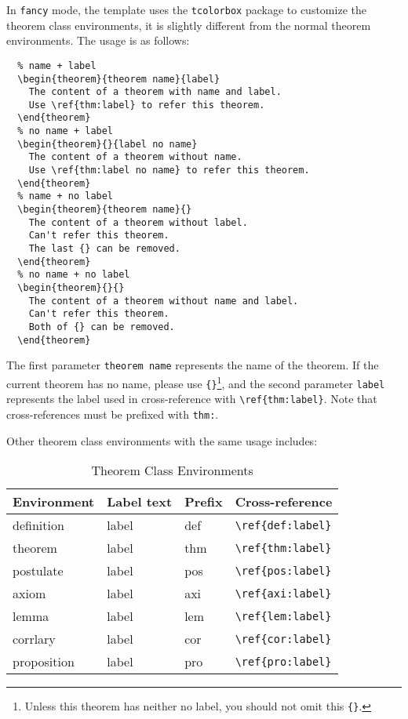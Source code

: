 \documentclass[11pt]{elegantbook}
\begin{document}
In \lstinline{fancy} mode, the template uses the \lstinline{tcolorbox} package to customize the theorem class environments, it is slightly different from the normal theorem environments. The usage is as follows:
\begin{lstlisting}
  % name + label
  \begin{theorem}{theorem name}{label}
    The content of a theorem with name and label. 
    Use \ref{thm:label} to refer this theorem.
  \end{theorem}
  % no name + label
  \begin{theorem}{}{label no name}
    The content of a theorem without name.
    Use \ref{thm:label no name} to refer this theorem.
  \end{theorem}
  % name + no label
  \begin{theorem}{theorem name}{}
    The content of a theorem without label.
    Can't refer this theorem.
    The last {} can be removed.
  \end{theorem}
  % no name + no label
  \begin{theorem}{}{}
    The content of a theorem without name and label.
    Can't refer this theorem.
    Both of {} can be removed.
  \end{theorem}
  \end{lstlisting}

The first parameter \lstinline{theorem name} represents the name of the theorem. If the current theorem has no name, please use \lstinline|{}|\cprotect\footnote{Unless this theorem has neither no label, you should not omit this \verb|{}|.}, and the second parameter \lstinline{label} represents the label used in cross-reference with \verb|\ref{thm:label}|. Note that cross-references must be prefixed with \lstinline{thm:}. 

Other theorem class environments with the same usage includes:

\begin{table}[htbp]
\centering
\caption{Theorem Class Environments}
  \begin{tabular}{llll}
  \toprule
  Environment & Label text & Prefix & Cross-reference \\
  \midrule
  definition & label & def   & \lstinline|\ref{def:label}| \\
  theorem & label & thm   & \lstinline|\ref{thm:label}| \\
  postulate & label & pos & \lstinline|\ref{pos:label}| \\
  axiom & label & axi & \lstinline|\ref{axi:label}|\\
  lemma & label & lem   & \lstinline|\ref{lem:label}| \\
  corrlary & label & cor   & \lstinline|\ref{cor:label}| \\
  proposition & label & pro   & \lstinline|\ref{pro:label}| \\
  \bottomrule
  \end{tabular}%
\label{tab:theorem-class}%
\end{table}%
\end{document}
